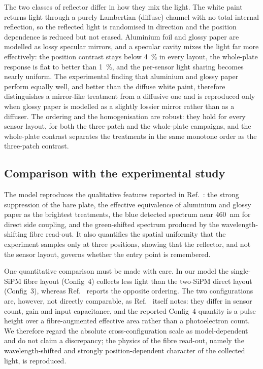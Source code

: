 \documentclass[3p]{elsarticle}
\newcommand{\sipm}{SiPM}
\begin{document}
The two classes of reflector differ in how they mix the light. The white paint
returns light through a purely Lambertian (diffuse) channel with no total
internal reflection, so the reflected light is randomised in direction and the
position dependence is reduced but not erased. Aluminium foil and glossy paper
are modelled as lossy specular mirrors, and a specular cavity mixes the light
far more effectively: the position contrast stays below \SI{4}{\percent} in
every layout, the whole-plate response is flat to better than \SI{1}{\percent},
and the per-sensor light sharing becomes nearly uniform. The experimental
finding that aluminium and glossy paper perform equally well, and better than
the diffuse white paint, therefore distinguishes a mirror-like treatment from a
diffusive one and is reproduced only when glossy paper is modelled as a slightly
lossier mirror rather than as a diffuser. The ordering and the homogenisation
are robust: they hold for every sensor layout, for both the three-patch and the
whole-plate campaigns, and the whole-plate contrast separates the treatments in
the same monotone order as the three-patch contrast.

\subsection{Comparison with the experimental study}
The model reproduces the qualitative features reported in Ref.~\cite{Rao2025}:
the strong suppression of the bare plate, the effective equivalence of
aluminium and glossy paper as the brightest treatments, the blue detected
spectrum near \SI{460}{\nano\meter} for direct side coupling, and the
green-shifted spectrum produced by the wavelength-shifting fibre read-out. It
also quantifies the spatial uniformity that the experiment samples only at three
positions, showing that the reflector, and not the sensor layout, governs
whether the entry point is remembered.

One quantitative comparison must be made with care. In our model the
single-\sipm{} fibre layout (Config~4) collects less light than the two-\sipm{}
direct layout (Config~3), whereas Ref.~\cite{Rao2025} reports the opposite
ordering. The two configurations are, however, not directly comparable, as
Ref.~\cite{Rao2025} itself notes: they differ in sensor count, gain and input
capacitance, and the reported Config~4 quantity is a pulse height over a
fibre-augmented effective area rather than a photoelectron count. We therefore
regard the absolute cross-configuration scale as model-dependent and do not
claim a discrepancy; the physics of the fibre read-out, namely the
wavelength-shifted and strongly position-dependent character of the collected
light, is reproduced.
\end{document}
